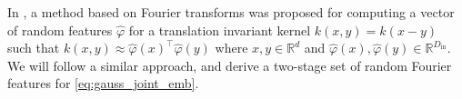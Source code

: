 \documentclass[english]{article}
\theoremstyle{plain}
\theoremstyle{plain}
\newcommand{\factor}{f}				%
\newcommand{\outV}{V}                         %
\newcommand{\approxMsg}[3]{M_{#1 \rightarrow #2}^{#3}}			%
\begin{document}


In \cite{Rahimi2007}, a method based on Fourier transforms was proposed for computing a vector
of random features $\hat{\varphi}$ for a translation invariant kernel $k(x,y) = k(x-y)$
 such that $k(x, y) \approx \hat{\varphi}(x)^\top \hat{\varphi}(y)$
where $x,y \in \mathbb{R}^d$ and $\hat{\varphi}(x), \hat{\varphi}(y) \in \mathbb{R}^{D_\mathrm{in}}$.  
We will follow a similar approach, and derive 
a two-stage set of random Fourier features for \eqref{eq:gauss_joint_emb}.
\end{document}
